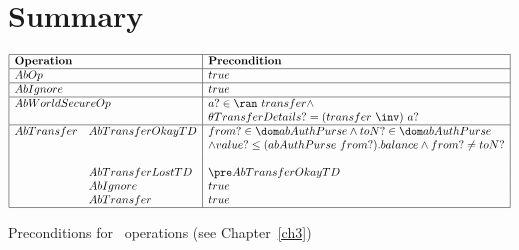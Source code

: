 \newpage

\section{Summary}\label{ch8.summary}

\begin{table}[ht]
    $\begin{array}{@{}|ll|l|@{}}
        \hline
        \mbox{\textbf{Operation}} &  & \mbox{\textbf{Precondition}} \\
        \hline
        AbOp            &             & true \\
        \hline
        AbIgnore        &             & true \\
        \hline
        \multicolumn{2}{@{}|l|}{AbWorldSecureOp} & a? \in \ran~transfer \land \\
                        &             & \theta TransferDetails? = (transfer~\inv)~a? \\
        \hline
        AbTransfer & AbTransferOkayTD & from? \in \dom abAuthPurse \land toN? \in \dom abAuthPurse \\
                   &                  & \land value? \leq  (abAuthPurse~from?).balance \land from? \neq toN? \\ && \\
                   & AbTransferLostTD & \pre AbTransferOkayTD \\
                   & AbIgnore         & true \\
                   & AbTransfer       & true \\
        \hline
    \end{array}$
    \caption{Preconditions for \Abs\ operations (see Chapter~\ref{ch3})}
\end{table}

